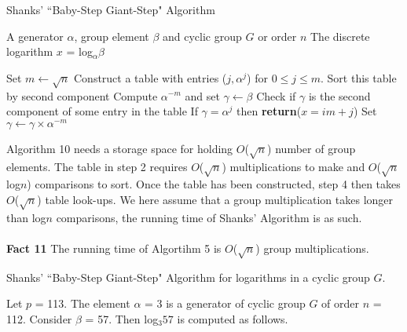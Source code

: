 \documentclass[iwp,first]{luthesis}
\begin{document}
\begin{algorithm}
\caption{Shanks' ``Baby-Step Giant-Step" Algorithm}
\begin{algorithmic}
\REQUIRE A generator $\alpha$, group element $\beta$ and cyclic group $G$ or order $n$
\ENSURE The discrete logarithm $x$ = log$_{\alpha}\beta$
\begin{enumerate}
\STATE Set $m \leftarrow \sqrt{n}$
\STATE Construct a table with entries ($j, \alpha^j$) for $0 \leq j \leq m$. Sort this table by second component
\STATE Compute $\alpha^{-m}$ and set $\gamma \leftarrow \beta$
 Check if $\gamma$ is the second component of some entry in the table
 If $\gamma = \alpha^j$ then \textbf{return}($x = im + j$)
 Set $\gamma \leftarrow \gamma \times \alpha^{-m}$
\ENDFOR
\end{enumerate}
\end{algorithmic}
\end{algorithm}

Algorithm 10 needs a storage space for holding $O$($\sqrt{n}$) number of group elements. The table in step 2 requires $O$($\sqrt{n}$) multiplications to make and $O$($\sqrt{n}$log$n$) comparisons to sort. Once the table has been constructed, step 4 then takes $O$($\sqrt{n}$) table look-ups. We here assume that a group multiplication takes longer than log$n$ comparisons, the running time of Shanks' Algorithm is as such.
\\
\\
\textbf{Fact 11} The running time of Algortihm 5 is $O$($\sqrt{n}$) group multiplications.
\begin{example} Shanks' ``Baby-Step Giant-Step" Algorithm for logarithms in a cyclic group $G$.
\end{example}

Let $p$ = 113. The element $\alpha$ = 3 is a generator of  cyclic group $G$ of order $n$ = 112. Consider $\beta$ = 57. Then log$_{3}57$ is computed as follows. 
\end{document}
